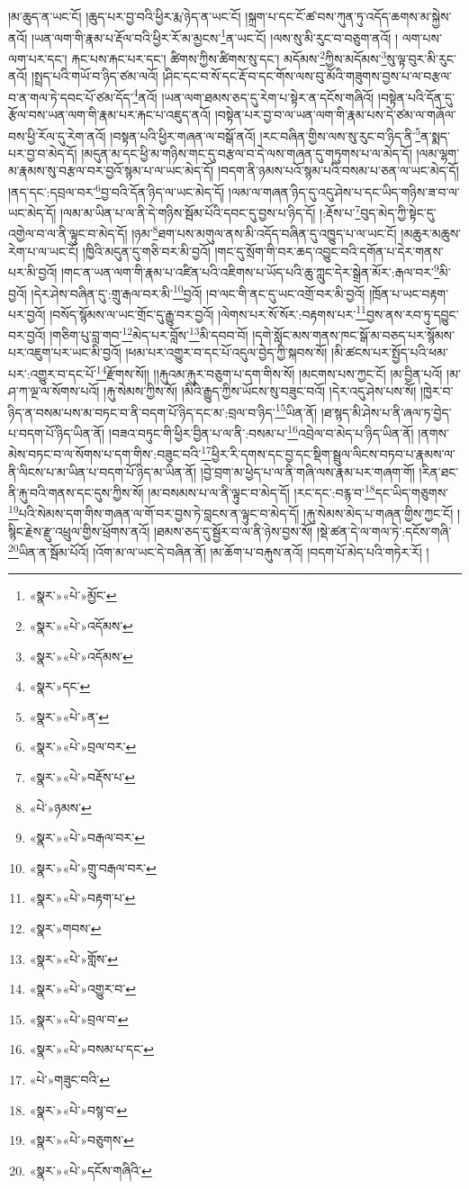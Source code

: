 །མ་ཆུད་ན་ཡང་ངོ། །ཆུད་པར་བྱ་བའི་ཕྱིར་རྨ་ཉེད་ན་ཡང་ངོ། །སྐྲག་པ་དང་ངོ་ཚ་བས་ཀུན་ཏུ་འདོད་ཆགས་མ་སྐྱེས་ནའོ། །ཡན་ལག་གི་རྣམ་པ་རྡོལ་བའི་ཕྱིར་རོ་མ་མྱངས་\footnote{«སྣར་»«པེ་»མྱོང་}ན་ཡང་ངོ། །ལས་སུ་མི་རུང་བ་བཅུག་ནའོ། །
ལག་པས་ལག་པར་དང་། རྐང་པས་རྐང་པར་དང་། ཚིགས་ཀྱིས་ཚིགས་སུ་དང་། མདོམས་\footnote{«སྣར་»«པེ་»འདོམས་}ཀྱིས་མདོམས་\footnote{«སྣར་»«པེ་»འདོམས་}སུ་ལྟ་བུར་མི་རུང་ནའོ། །སྤྲད་པའི་གཡོ་བ་ཉིད་ཙམ་ལའོ། །ཤིང་དང་བ་སོ་དང་རྡོ་བ་དང་གོས་ལས་བུ་མོའི་གཟུགས་བྱས་པ་ལ་བརྩལ་བ་ན་གལ་ཏེ་དབང་པོ་ཙམ་དོད་\footnote{«སྣར་»དང་}ནའོ། །ཡན་ལག་ཐམས་ཅད་དུ་རེག་པ་སྟེར་ན་དངོས་གཞིའོ། །བསྟེན་པའི་དོན་དུ་རྩོལ་བས་ཡན་ལག་གི་རྣམ་པར་རྐང་པ་འཇུད་ནའོ། །བསྟེན་པར་བྱ་བ་ལ་ཡན་ལག་གི་རྣམ་པས་དེ་ཙམ་ལ་གཞོལ་བས་ཕྱི་རོལ་དུ་རེག་ནའོ། །བསྟན་པའི་ཕྱིར་གཞན་ལ་བསྒོ་ནའོ། །རང་བཞིན་གྱིས་ལས་སུ་རུང་བ་ཉིད་ནི་\footnote{«སྣར་»«པེ་»ན་}ན་སྨད་པར་བྱ་བ་མེད་དོ། །མདུན་མ་དང་ཕྱི་མ་གཉིས་གང་དུ་བརྩལ་བ་དེ་ལས་གཞན་དུ་གཏུགས་པ་ལ་མེད་དོ། །ལམ་ལྷག་མ་རྣམས་སུ་བརྩལ་བར་བྱའོ་སྙམ་པ་ལ་ཡང་མེད་དོ། །བདག་ནི་ཉམས་པའོ་སྙམ་པའི་བསམ་པ་ཅན་ལ་ཡང་མེད་དོ། །ནད་དང་:དབྲལ་བར་\footnote{«སྣར་»«པེ་»བྲལ་བར་}བྱ་བའི་དོན་ཉིད་ལ་ཡང་མེད་དོ། །ལམ་ལ་གཞན་ཉིད་དུ་འདུ་ཤེས་པ་དང་ཡིད་གཉིས་ཟ་བ་ལ་ཡང་མེད་དོ། །ལམ་མ་ཡིན་པ་ལ་ནི་དེ་གཉིས་སྦོམ་པོའི་དབང་དུ་བྱས་པ་ཉིད་དོ། །:རྡོས་པ་\footnote{«སྣར་»«པེ་»བརྡོས་པ་}བུད་མེད་ཀྱི་སྟེང་དུ་འགྱེལ་བ་ལ་ནི་ལྟུང་བ་མེད་དོ། །ཉམ་\footnote{«པེ་»ཉམས་}ཐག་པས་མགུལ་ནས་མི་འདོད་བཞིན་དུ་འཁྱུད་པ་ལ་ཡང་ངོ། །མཆུར་མཆུས་རེག་པ་ལ་ཡང་ངོ། །ཁྱིའི་མདུན་དུ་གཅི་བར་མི་བྱའོ། །གང་དུ་སྲོག་གི་བར་ཆད་འབྱུང་བའི་དགོན་པ་དེར་གནས་པར་མི་བྱའོ། །གང་ན་ཡན་ལག་གི་རྣམ་པ་འཛིན་པའི་འཇིགས་པ་ཡོད་པའི་ཆུ་ཀླུང་དེར་སྒྲེན་མོར་:རྒལ་བར་\footnote{«སྣར་»«པེ་»བརྒལ་བར་}མི་བྱའོ། །དེར་ཤེས་བཞིན་དུ་:གྲུ་རྒལ་བར་མི་\footnote{«སྣར་»«པེ་»གྲུ་བརྒལ་བར་}བྱའོ། །བ་ལང་གི་ནང་དུ་ཡང་འགྲོ་བར་མི་བྱའོ། །ཁྲོན་པ་ཡང་བརྟག་པར་བྱའོ། །བསོད་སྙོམས་ལ་ཡང་གྲོང་དུ་རྒྱུ་བར་བྱའོ། །ལེགས་པར་སོ་སོར་:བརྟགས་པར་\footnote{«སྣར་»«པེ་»བརྟག་པ་}བྱས་ནས་རབ་ཏུ་དབྱུང་བར་བྱའོ། །གཅིག་པུ་བླ་གབ་\footnote{«སྣར་»གབས་}མེད་པར་བློས་\footnote{«སྣར་»«པེ་»གློས་}མི་དབབ་བོ། །དགེ་སློང་མས་གནས་ཁང་སྒོ་མ་བཅད་པར་སྙོམས་པར་འཇུག་པར་ཡང་མི་བྱའོ། །ཕམ་པར་འགྱུར་བ་དང་པོ་འདུལ་བྱེད་ཀྱི་སྐབས་སོ། །མི་ཚངས་པར་སྤྱོད་པའི་ཕམ་པར་:འགྱུར་བ་དང་པོ་\footnote{«སྣར་»«པེ་»འགྱུར་བ་}རྫོགས་སོ།། །།རྐུའམ་རྐུར་བཅུག་པ་དག་གིས་སོ། །མངགས་པས་ཀྱང་ངོ། །མ་བྱིན་པའོ། །མ་ཤ་ཀ་ལྔ་ལ་སོགས་པའོ། །རྐུ་སེམས་ཀྱིས་སོ། །མིའི་རྒྱུད་ཀྱིས་ཡོངས་སུ་བཟུང་བའོ། །དེར་འདུ་ཤེས་པས་སོ། །ཁྱེར་བ་ཉིད་ན་བསམ་པས་མ་བཏང་བ་ནི་བདག་པོ་ཉིད་དང་མ་:བྲལ་བ་ཉིད་\footnote{«སྣར་»«པེ་»བྲལ་བ་}ཡིན་ནོ། །ཐ་སྙད་མི་ཤེས་པ་ནི་ཞལ་ཏ་བྱེད་པ་བདག་པོ་ཉིད་ཡིན་ནོ། །བཟའ་བཏུང་གི་ཕྱིར་བྱིན་པ་ལ་ནི་:བསམ་པ་\footnote{«སྣར་»«པེ་»བསམ་པ་དང་}འབྲེལ་བ་མེད་པ་ཉིད་ཡིན་ནོ། །ནགས་མེས་བཏང་བ་ལ་སོགས་པ་དག་གིས་:བཟུང་བའི་\footnote{«པེ་»གཟུང་བའི་}ཕྱིར་རི་དགས་དང་བྱ་དང་སྡིག་སྦྲུལ་ལིངས་བཏབ་པ་རྣམས་ལ་ནི་ལིངས་པ་མ་ཡིན་པ་བདག་པོ་ཉིད་མ་ཡིན་ནོ། །བྱེ་བྲག་མ་ཕྱེད་པ་ལ་ནི་གཞི་ལས་རྣམ་པར་གཞག་གོ། །རིན་ཐང་ནི་རྐུ་བའི་གནས་དང་དུས་ཀྱིས་སོ། །མ་བསམས་པ་ལ་ནི་ལྟུང་བ་མེད་དོ། །རང་དང་:བརྙ་བ་\footnote{«སྣར་»«པེ་»བསྙ་བ་}དང་ཡིད་གཅུགས་\footnote{«སྣར་»«པེ་»བཅུགས་}པའི་སེམས་དག་གིས་གཞན་ལ་གོ་བར་བྱས་ཏེ་བླངས་ན་ལྟུང་བ་མེད་དོ། །རྐུ་སེམས་མེད་པ་གཞན་གྱིས་ཀྱང་ངོ། །སྙིང་རྗེས་རྫུ་འཕྲུལ་གྱིས་ཕྲོགས་ནའོ། །ཐམས་ཅད་དུ་སྦྱོར་བ་ལ་ནི་ཉེས་བྱས་སོ། །སྡེ་ཚན་དེ་ལ་གལ་ཏེ་:དངོས་གཞི་\footnote{«སྣར་»«པེ་»དངོས་གཞིའི་}ཡིན་ན་སྦོམ་པོའོ། །འོག་མ་ལ་ཡང་དེ་བཞིན་ནོ། །མ་ཆོག་པ་བརྐུས་ནའོ། །བདག་པོ་མེད་པའི་གཏེར་རོ། །
